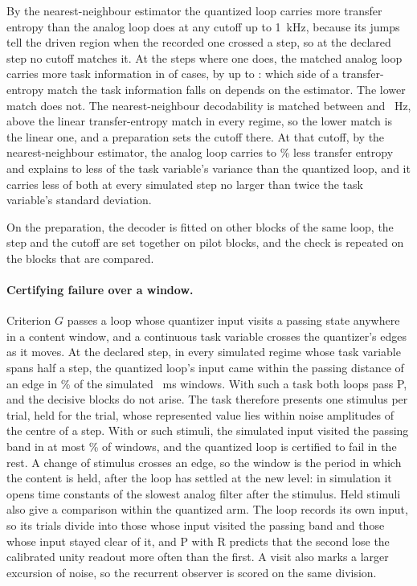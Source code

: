 \documentclass[12pt]{article}
\begin{document}
By the nearest-neighbour estimator the quantized loop carries more transfer
entropy than the analog loop does at any cutoff up to 1~kHz, because its jumps
tell the driven region when the recorded one crossed a step, so at the declared
step no cutoff matches it. At the steps where one does, the matched analog loop
carries more task information in \uBrNnGapPositive{} of \uBrNnGapCases{} cases,
by up to \uBrNnGapMax{}: which side of a transfer-entropy match the task
information falls on depends on the estimator. The lower match does not. The
nearest-neighbour decodability is matched between \uBrNnCutoffMin{} and
\uBrNnCutoffMax{}~Hz, above the linear transfer-entropy match in every regime,
so the lower match is the linear one, and a preparation sets the cutoff there.
At that cutoff, by the nearest-neighbour estimator, the analog loop carries
\uBrCommonTeMinPercent{} to \uBrCommonTeMaxPercent\% less transfer entropy and
explains \uBrCommonGapMin{} to \uBrCommonGapMax{} less of the task variable's
variance than the quantized loop, and it carries less of both at every simulated
step no larger than twice the task variable's standard deviation.

On the preparation, the decoder is fitted on other blocks of the same loop, the
step and the cutoff are set together on pilot blocks, and the check is repeated
on the blocks that are compared.

\paragraph{Certifying failure over a window.} Criterion $G$ passes a loop whose
quantizer input visits a passing state anywhere in a content window, and a
continuous task variable crosses the quantizer's edges as it moves. At the
declared step, in every simulated regime whose task variable spans half a step,
the quantized loop's input came within the passing distance of an edge in
\uBrOuVisitMinPercent\% of the simulated \ueContentMs{}~ms windows. With such a task
both loops pass P, and the decisive blocks do not arise. The task therefore
presents one stimulus per trial, held for the trial, whose represented value
lies within \uBrHeldSpread{} noise amplitudes of the centre of a step. With
\uBrHeldStimuliFew{} or \uBrHeldStimuliMany{} such stimuli, the simulated input
visited the passing band in at most \uBrHeldVisitMaxPercent\% of windows, and
the quantized loop is certified to fail in the rest. A change of stimulus
crosses an edge, so the window is the period in which the content is held,
after the loop has settled at the new level: in simulation it opens
\uBrHeldSettleTaus{} time constants of the slowest analog filter after the
stimulus. Held stimuli also give a
comparison within the quantized arm. The loop records its own input, so its
trials divide into those whose input visited the passing band and those whose
input stayed clear of it, and P with R predicts that the second lose the
calibrated unity readout more often than the first. A visit also marks a
larger excursion of noise, so the recurrent observer is scored on the same
division.
\end{document}
